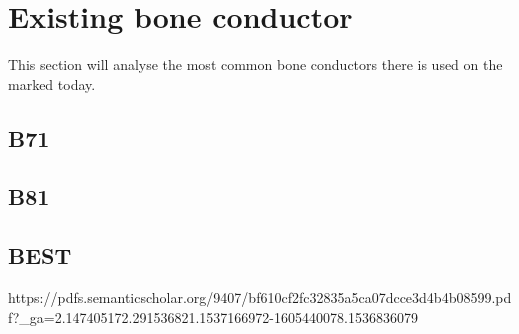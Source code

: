 \section{Existing bone conductor}
This section will analyse the most common bone conductors there is used on the marked today. 

\subsection{B71}
\citep{the_balanced_2003}


\subsection{B81}

\subsection{BEST}

https://pdfs.semanticscholar.org/9407/bf610cf2fc32835a5ca07dcce3d4b4b08599.pdf?_ga=2.147405172.291536821.1537166972-1605440078.1536836079